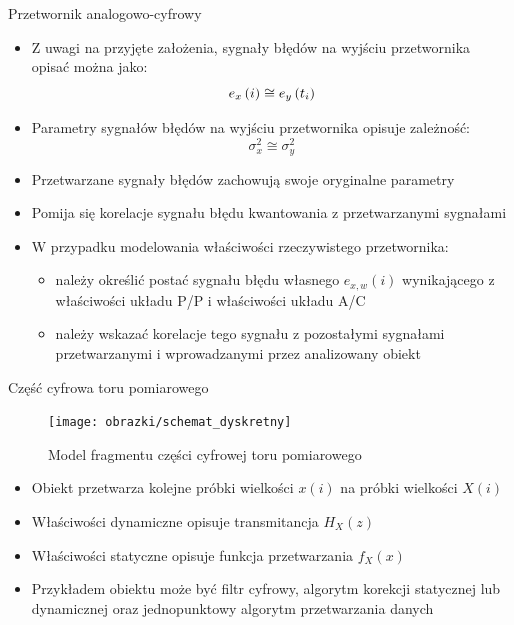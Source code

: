 \documentclass[12pt, polish, aspectratio = 169]{beamer}
\begin{document}
\begin{frame}{Przetwornik analogowo-cyfrowy}
\begin{itemize}
\item Z uwagi na przyjęte założenia, sygnały błędów na wyjściu przetwornika opisać można jako:
\begin{equation}
e_{x} \left(i\right) \cong e_{y} \left(t_{i}\right) \label{eq:adc_errout}
\end{equation}
\item Parametry sygnałów błędów na wyjściu przetwornika opisuje zależność:
\begin{equation}
\sigma_{x}^{2} \cong \sigma_{y}^{2} \label{eq:adc_varout}
\end{equation}
\item Przetwarzane sygnały błędów zachowują swoje oryginalne parametry
\item Pomija się korelacje sygnału błędu kwantowania z przetwarzanymi sygnałami
\item W przypadku modelowania właściwości rzeczywistego przetwornika:
	\begin{itemize}
	\item należy określić postać sygnału błędu własnego $e_{x,w}(i)$ wynikającego z właściwości układu P/P i właściwości układu A/C
	\item należy wskazać korelacje tego sygnału z pozostałymi sygnałami przetwarzanymi i wprowadzanymi przez analizowany obiekt
	\end{itemize}
\end{itemize}
\end{frame}

\begin{frame}{Część cyfrowa toru pomiarowego}
\begin{figure}
\texttt{[image: obrazki/schemat\_dyskretny]}
\caption{Model fragmentu części cyfrowej toru pomiarowego}
\end{figure}
\begin{itemize}
\item Obiekt przetwarza kolejne próbki wielkości $x(i)$ na próbki wielkości $X(i)$
\item Właściwości dynamiczne opisuje transmitancja $H_{X}(z)$
\item Właściwości statyczne opisuje funkcja przetwarzania $f_{X}(x)$
\item Przykładem obiektu może być filtr cyfrowy, algorytm korekcji statycznej lub dynamicznej oraz jednopunktowy algorytm przetwarzania danych
\end{itemize}
\end{frame}
\end{document}

